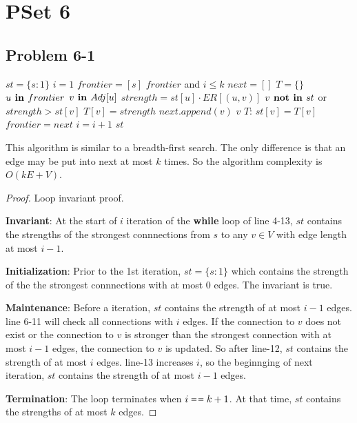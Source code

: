 \documentclass[12pt,twoside]{article}
\begin{document}
\section{PSet 6}
\subsection{Problem 6-1}

\begin{codebox}
\li $st = \{s: 1\}$
\li $i = 1$
\li $frontier = [s]$
\li \While $frontier$ and $i \le k$
\li \Do $next = []$
\li $T = \{\}$
\li \For $u \textbf{ in } frontier$
\li \Do \For $v \textbf{ in } Adj[u]$
\li \Do $strength = st[u] \cdot ER[(u, v)]$
\li \If $v \textbf{ not}\textbf{ in } st $ or $strength > st[v]$
\li \Then $T[v] = strength$
\li $next.append(v)$
\End \End \End
\li \For $v$ \In $T$:
\li \Do $st[v] = T[v]$ \End
\li $frontier = next$
\li $i = i + 1$
\End \End
\li \Return $st$
\end{codebox}

This algorithm is similar to a breadth-first search. The only difference is that
an edge may be put into next at most $k$ times. So the algorithm complexity is
$O(kE+V)$.

\begin{proof} Loop invariant proof.


\textbf{Invariant}: At the start of $i$ iteration of the \textbf{while} loop of
line 4-13, $st$ contains the strengths of the strongest connnections from $s$ to
any $v \in V$ with edge length at most $i-1$.

\textbf{Initialization}: Prior to the 1st iteration, $st = \{s: 1\}$ which
contains the strength of the the strongest connnections with at most $0$ edges.
The invariant is true.

\textbf{Maintenance}: Before a iteration, $st$ contains the strength of at most
$i-1$ edges. line 6-11 will check all connections with $i$ edges. If the
connection to $v$ does not exist or the connection to $v$ is stronger than the
strongest connection with at most $i-1$ edges, the connection to $v$ is updated.
So after line-12, $st$ contains the strength of at most $i$ edges. line-13
increases $i$, so the beginnging of next iteration, $st$ contains the strength
of at most $i-1$ edges.

\textbf{Termination}: The loop terminates when $i \isequal k+1$. At that time,
$st$ contains the strengths of at most $k$ edges.

\end{proof}
\end{document}
